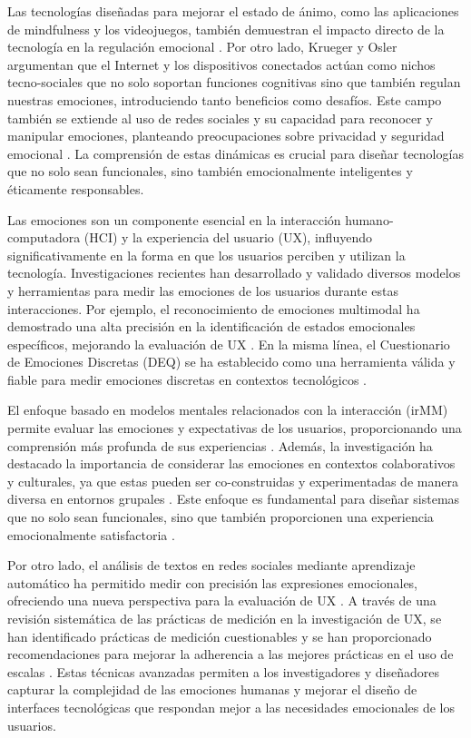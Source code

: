 Las tecnologías diseñadas para mejorar el estado de ánimo, como las aplicaciones de mindfulness y los videojuegos, también demuestran el impacto directo de la tecnología en la regulación emocional \cite{wadley_mood-enhancing_2016}. Por otro lado, Krueger y Osler \citeyear{krueger_engineering_2019} argumentan que el Internet y los dispositivos conectados actúan como nichos tecno-sociales que no solo soportan funciones cognitivas sino que también regulan nuestras emociones, introduciendo tanto beneficios como desafíos. Este campo también se extiende al uso de redes sociales y su capacidad para reconocer y manipular emociones, planteando preocupaciones sobre privacidad y seguridad emocional \cite{andalibi_human_2020}. La comprensión de estas dinámicas es crucial para diseñar tecnologías que no solo sean funcionales, sino también emocionalmente inteligentes y éticamente responsables.

Las emociones son un componente esencial en la interacción humano-computadora (HCI) y la experiencia del usuario (UX), influyendo significativamente en la forma en que los usuarios perciben y utilizan la tecnología. Investigaciones recientes han desarrollado y validado diversos modelos y herramientas para medir las emociones de los usuarios durante estas interacciones. Por ejemplo, el reconocimiento de emociones multimodal ha demostrado una alta precisión en la identificación de estados emocionales específicos, mejorando la evaluación de UX \cite{razzaq_hybrid_2023}. En la misma línea, el Cuestionario de Emociones Discretas (DEQ) se ha establecido como una herramienta válida y fiable para medir emociones discretas en contextos tecnológicos \cite{harmon-jones_discrete_2016}.

El enfoque basado en modelos mentales relacionados con la interacción (irMM) permite evaluar las emociones y expectativas de los usuarios, proporcionando una comprensión más profunda de sus experiencias \cite{ahram_user_2018}. Además, la investigación ha destacado la importancia de considerar las emociones en contextos colaborativos y culturales, ya que estas pueden ser co-construidas y experimentadas de manera diversa en entornos grupales \cite{shami_measuring_2008}. Este enfoque es fundamental para diseñar sistemas que no solo sean funcionales, sino que también proporcionen una experiencia emocionalmente satisfactoria \cite{lottridge_designing_2009}.

Por otro lado, el análisis de textos en redes sociales mediante aprendizaje automático ha permitido medir con precisión las expresiones emocionales, ofreciendo una nueva perspectiva para la evaluación de UX \cite{brady_theory-driven_2021}. A través de una revisión sistemática de las prácticas de medición en la investigación de UX, se han identificado prácticas de medición cuestionables y se han proporcionado recomendaciones para mejorar la adherencia a las mejores prácticas en el uso de escalas \cite{perrig_measurement_2024}. Estas técnicas avanzadas permiten a los investigadores y diseñadores capturar la complejidad de las emociones humanas y mejorar el diseño de interfaces tecnológicas que respondan mejor a las necesidades emocionales de los usuarios.


